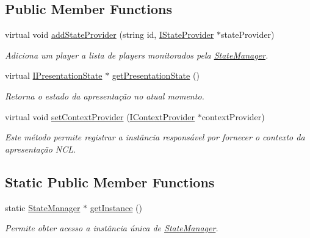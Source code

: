 \subsection*{Public Member Functions}
\begin{DoxyCompactItemize}
\item 
virtual void \hyperlink{classbr_1_1ufscar_1_1lince_1_1ginga_1_1wac_1_1state_1_1StateManager_aa02a5c2cc3e5933a60225dc1b67e75e8}{addStateProvider} (string id, \hyperlink{classbr_1_1ufscar_1_1lince_1_1ginga_1_1wac_1_1state_1_1IStateProvider}{IStateProvider} $\ast$stateProvider)
\begin{DoxyCompactList}\small\item\em Adiciona um player a lista de players monitorados pela \hyperlink{classbr_1_1ufscar_1_1lince_1_1ginga_1_1wac_1_1state_1_1StateManager}{StateManager}. \item\end{DoxyCompactList}\item 
virtual \hyperlink{classbr_1_1ufscar_1_1lince_1_1ginga_1_1wac_1_1state_1_1IPresentationState}{IPresentationState} $\ast$ \hyperlink{classbr_1_1ufscar_1_1lince_1_1ginga_1_1wac_1_1state_1_1StateManager_affbdaf15d59f7df0aa182944818c3ad8}{getPresentationState} ()
\begin{DoxyCompactList}\small\item\em Retorna o estado da apresentação no atual momento. \item\end{DoxyCompactList}\item 
virtual void \hyperlink{classbr_1_1ufscar_1_1lince_1_1ginga_1_1wac_1_1state_1_1StateManager_a118df2766ab99574653b4f45d1ea75fd}{setContextProvider} (\hyperlink{classbr_1_1ufscar_1_1lince_1_1ginga_1_1wac_1_1state_1_1IContextProvider}{IContextProvider} $\ast$contextProvider)
\begin{DoxyCompactList}\small\item\em Este método permite registrar a instância responsável por fornecer o contexto da apresentação NCL. \item\end{DoxyCompactList}\end{DoxyCompactItemize}
\subsection*{Static Public Member Functions}
\begin{DoxyCompactItemize}
\item 
static \hyperlink{classbr_1_1ufscar_1_1lince_1_1ginga_1_1wac_1_1state_1_1StateManager}{StateManager} $\ast$ \hyperlink{classbr_1_1ufscar_1_1lince_1_1ginga_1_1wac_1_1state_1_1StateManager_a7875cddb02bd5dfa72539234438b3a7e}{getInstance} ()
\begin{DoxyCompactList}\small\item\em Permite obter acesso a instância única de \hyperlink{classbr_1_1ufscar_1_1lince_1_1ginga_1_1wac_1_1state_1_1StateManager}{StateManager}. \item\end{DoxyCompactList}\end{DoxyCompactItemize}


